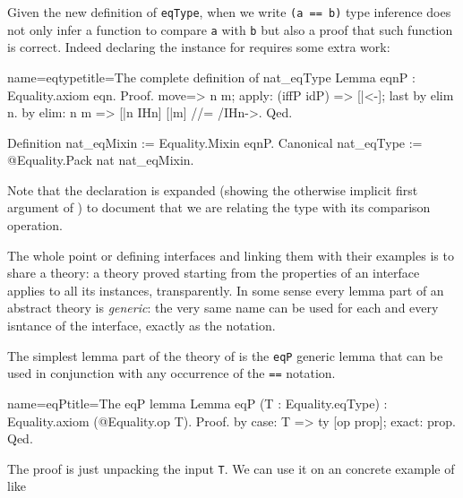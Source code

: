 Given the new definition of \lstinline/eqType/,
when we write \lstinline/(a == b)/ type inference does not only infer
a function to compare \lstinline/a/ with \lstinline/b/ but also a
proof that such function is correct.
Indeed declaring the  instance for  requires some
extra work:

\begin{coq}{name=eqtype}{title=The complete definition of nat\_eqType}
Lemma eqnP : Equality.axiom eqn.
Proof.
move=> n m; apply: (iffP idP) => [|<-]; last by elim n.
by elim: n m => [|n IHn] [|m] //= /IHn->.
Qed.

Definition nat_eqMixin := Equality.Mixin eqnP.
Canonical nat_eqType := @Equality.Pack nat nat_eqMixin.
\end{coq}

Note that the  declaration is expanded (showing the
otherwise implicit first argument of ) to document that
we are relating the type  with its comparison operation.

\mcbREQUIRE{}
\label{sec:eqtypetheory}

The whole point or defining interfaces and linking them with their
examples is to share a theory: a theory proved starting from the
properties of an interface applies to all its instances,
transparently.  In some sense every lemma part of an abstract theory
is \emph{generic}: the very same name can be used for each and every
isntance of the interface, exactly as the \C{==} notation.

The simplest lemma part of the theory of  is the 
\lstinline/eqP/ generic lemma that can be used in conjunction with
any occurrence of the \lstinline/==/ notation.

\begin{coq}{name=eqP}{title=The eqP lemma}
Lemma eqP (T : Equality.eqType) : Equality.axiom (@Equality.op T).
Proof. by case: T => ty [op prop]; exact: prop. Qed.
\end{coq}

The proof is just unpacking the input \lstinline/T/.
We can use it on an concrete example of  like 


